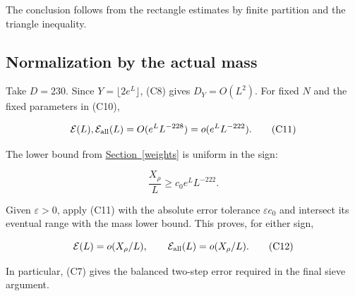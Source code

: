 The conclusion follows from the rectangle estimates by finite partition
and the triangle inequality.


\hypertarget{correlation-normalization-by-the-actual-mass}{%
\subsection{Normalization by the actual
mass}\label{correlation-normalization-by-the-actual-mass}}

Take \(D=230\). Since \(Y=\lfloor2e^L\rfloor\), (C8) gives
\(D_Y=O(L^2)\). For fixed \(N\) and the fixed parameters in (C10),

\[
\mathcal E(L),\mathcal E_{\rm all}(L)
 =O(e^LL^{-228})=o(e^LL^{-222}). \tag{C11}
\]

The lower bound from \protect\hyperlink{weights}{Section~\ref{weights}}
is uniform in the sign:

\[
\frac{X_\rho}{L}\ge c_0e^LL^{-222}.
\]

Given \(\varepsilon>0\), apply (C11) with the absolute error tolerance
\(\varepsilon c_0\) and intersect its eventual range with the mass lower
bound. This proves, for either sign,

\[
\mathcal E(L)=o(X_\rho/L),\qquad
\mathcal E_{\rm all}(L)=o(X_\rho/L). \tag{C12}
\]

In particular, (C7) gives the balanced two-step error required in the
final sieve argument.
